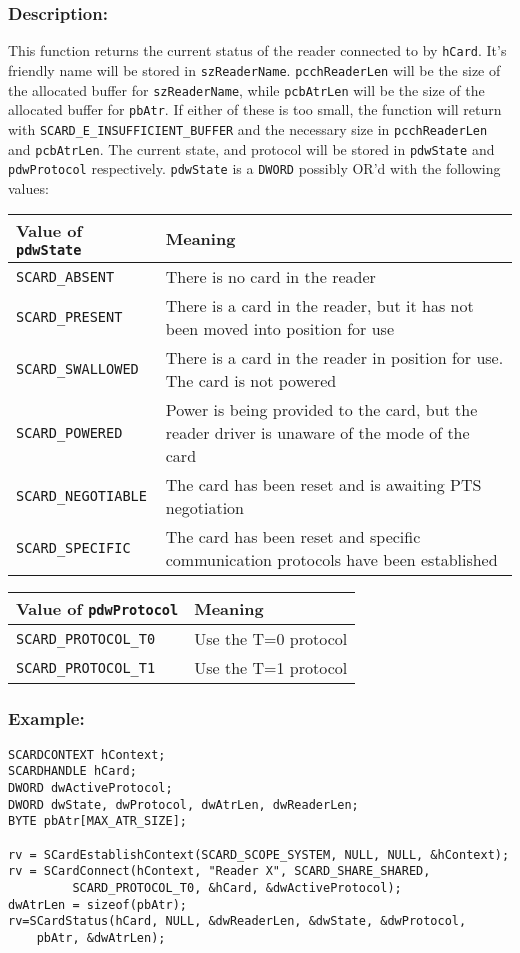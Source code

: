 \documentclass[a4paper,12pt]{article}
\newcommand{\desc}{\subsubsection{Description:}}
\newcommand{\example}{\subsubsection{Example:}}
\begin{document}
\desc

This function returns the current status of the reader connected to by
\texttt{hCard}.  It's friendly name will be stored in
\texttt{szReaderName}.  \texttt{pcchReaderLen} will be the size of the
allocated buffer for \texttt{szReaderName}, while \texttt{pcbAtrLen}
will be the size of the allocated buffer for \texttt{pbAtr}. If either
of these is too small, the function will return with
\texttt{SCARD\_E\_INSUFFICIENT\_BUFFER} and the necessary size in
\texttt{pcchReaderLen} and \texttt{pcbAtrLen}.  The current state, and
protocol will be stored in \texttt{pdwState} and \texttt{pdwProtocol}
respectively.  \texttt{pdwState} is a \texttt{DWORD} possibly OR'd with
the following values:


\begin{tabular}{|l|p{12cm}|}
\hline
Value of \texttt{pdwState} & Meaning \\
\hline
\hline
\texttt{SCARD\_ABSENT} & There is no card in the reader\\
\texttt{SCARD\_PRESENT} & There is a card in the reader, but it has not been moved into position for use\\
\texttt{SCARD\_SWALLOWED} & There is a card in the reader in position for use. The card is not powered\\
\texttt{SCARD\_POWERED} & Power is being provided to the card, but the reader driver is unaware of the mode of the card\\
\texttt{SCARD\_NEGOTIABLE} & The card has been reset and is awaiting PTS negotiation\\
\texttt{SCARD\_SPECIFIC} & The card has been reset and specific communication protocols have been established\\
\hline
\end{tabular}

\begin{tabular}{|l|l|}
\hline
Value of \texttt{pdwProtocol} & Meaning \\
\hline
\hline
\texttt{SCARD\_PROTOCOL\_T0} & Use the T=0 protocol\\
\texttt{SCARD\_PROTOCOL\_T1} & Use the T=1 protocol\\
\hline
\end{tabular}

\example

\begin{verbatim}
SCARDCONTEXT hContext;
SCARDHANDLE hCard;
DWORD dwActiveProtocol;
DWORD dwState, dwProtocol, dwAtrLen, dwReaderLen;
BYTE pbAtr[MAX_ATR_SIZE];

rv = SCardEstablishContext(SCARD_SCOPE_SYSTEM, NULL, NULL, &hContext);
rv = SCardConnect(hContext, "Reader X", SCARD_SHARE_SHARED,
         SCARD_PROTOCOL_T0, &hCard, &dwActiveProtocol);
dwAtrLen = sizeof(pbAtr);
rv=SCardStatus(hCard, NULL, &dwReaderLen, &dwState, &dwProtocol,
    pbAtr, &dwAtrLen);
\end{verbatim}
\end{document}
